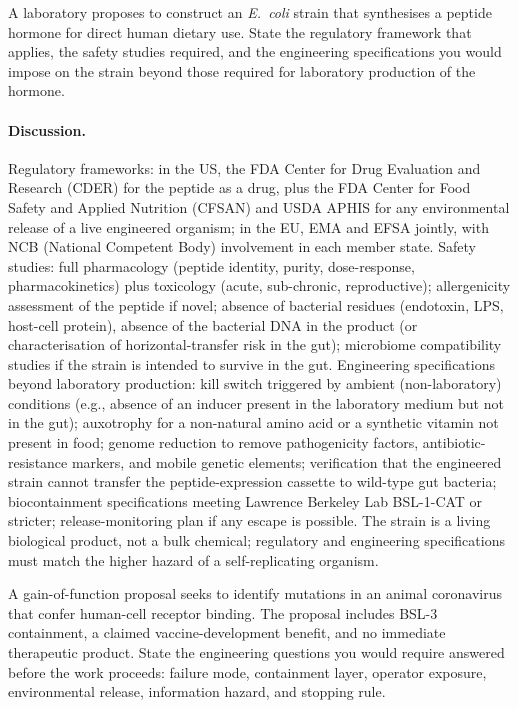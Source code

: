 \begin{exercise}
A laboratory proposes to construct an \emph{E.\ coli} strain that
synthesises a peptide hormone for direct human dietary use. State the
regulatory framework that applies, the safety studies required, and
the engineering specifications you would impose on the strain
beyond those required for laboratory production of the hormone.

\paragraph{Discussion.}
Regulatory frameworks: in the US, the FDA Center for Drug Evaluation
and Research (CDER) for the peptide as a drug, plus the FDA Center
for Food Safety and Applied Nutrition (CFSAN) and USDA APHIS for
any environmental release of a live engineered organism; in the EU,
EMA and EFSA jointly, with NCB (National Competent Body) involvement
in each member state. Safety studies: full pharmacology (peptide
identity, purity, dose-response, pharmacokinetics) plus toxicology
(acute, sub-chronic, reproductive); allergenicity assessment of the
peptide if novel; absence of bacterial residues (endotoxin, LPS,
host-cell protein), absence of the bacterial DNA in the product
(or characterisation of horizontal-transfer risk in the gut);
microbiome compatibility studies if the strain is intended to
survive in the gut. Engineering specifications beyond laboratory
production: kill switch triggered by ambient (non-laboratory)
conditions (e.g., absence of an inducer present in the laboratory
medium but not in the gut); auxotrophy for a non-natural amino acid
or a synthetic vitamin not present in food; genome reduction to
remove pathogenicity factors, antibiotic-resistance markers, and
mobile genetic elements; verification that the engineered strain
cannot transfer the peptide-expression cassette to wild-type gut
bacteria; biocontainment specifications meeting Lawrence Berkeley
Lab BSL-1-CAT or stricter; release-monitoring plan if any escape
is possible. The strain is a living biological product, not a
bulk chemical; regulatory and engineering specifications must
match the higher hazard of a self-replicating organism.
\end{exercise}

\begin{exercise}
A gain-of-function proposal seeks to identify mutations in an
animal coronavirus that confer human-cell receptor binding. The
proposal includes BSL-3 containment, a claimed vaccine-development
benefit, and no immediate therapeutic product. State the engineering
questions you would require answered before the work proceeds: failure
mode, containment layer, operator exposure, environmental release,
information hazard, and stopping rule.
\end{exercise}


